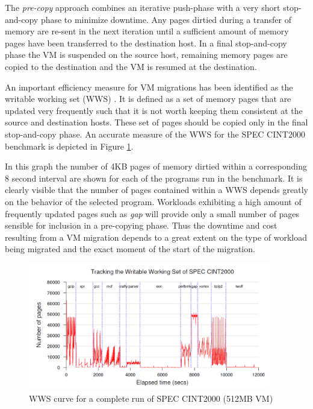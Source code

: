 The \textit{pre-copy} approach combines an iterative push-phase with a very short stop-and-copy phase to minimize downtime. Any pages dirtied during a transfer of memory are re-sent in the next iteration until a sufficient amount of memory pages have been transferred to the destination host. In a final stop-and-copy phase the VM is suspended on the source host, remaining memory pages are copied to the destination and the VM is resumed at the destination. 

An important efficiency measure for VM migrations has been identified as the writable working set (WWS) \cite{clark2005live}. It is defined as a set of memory pages that are updated very frequently such that it is not worth keeping them consistent at the source and destination hosts. These set of pages should be copied only in the final stop-and-copy phase. An accurate measure of the WWS for the SPEC CINT2000 benchmark is depicted in Figure \ref{fig:tracking_writable_working_set}. 

In this graph the number of 4KB pages of memory dirtied within a corresponding 8 second interval are shown for each of the programs run in the benchmark. 
It is clearly visible that the number of pages contained within a WWS depends greatly on the behavior of the selected program. Workloads exhibiting a high amount of frequently updated pages such as \textit{gap} will provide only a small number of pages sensible for inclusion in a pre-copying phase. 
Thus the downtime and cost resulting from a VM migration depends to a great extent on the type of workload being migrated and the exact moment of the start of the migration. 



\begin{figure}
	\centering
		\includegraphics[width=0.94\textwidth]{figures/state_of_the_art/tracking_writable_working_set.PNG}
	\caption{WWS curve for a complete run of SPEC CINT2000 (512MB VM) \cite{clark2005live}}
	\label{fig:tracking_writable_working_set}
\end{figure}



